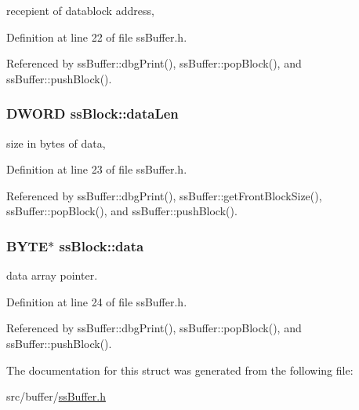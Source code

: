 recepient of datablock address, 



Definition at line 22 of file ssBuffer.h.



Referenced by ssBuffer::dbgPrint(), ssBuffer::popBlock(), and ssBuffer::pushBlock().

\hypertarget{structssBlock_ad3ca966219ea058e35c458f497d1ed0f}{
\subsubsection[{dataLen}]{\setlength{\rightskip}{0pt plus 5cm}DWORD {\bf ssBlock::dataLen}}}
\label{d2/dfa/structssBlock_ad3ca966219ea058e35c458f497d1ed0f}


size in bytes of data, 



Definition at line 23 of file ssBuffer.h.



Referenced by ssBuffer::dbgPrint(), ssBuffer::getFrontBlockSize(), ssBuffer::popBlock(), and ssBuffer::pushBlock().

\hypertarget{structssBlock_ac7f1c86e2783bf2ce7f0caea385d38a2}{
\subsubsection[{data}]{\setlength{\rightskip}{0pt plus 5cm}BYTE$\ast$ {\bf ssBlock::data}}}
\label{d2/dfa/structssBlock_ac7f1c86e2783bf2ce7f0caea385d38a2}


data array pointer. 



Definition at line 24 of file ssBuffer.h.



Referenced by ssBuffer::dbgPrint(), ssBuffer::popBlock(), and ssBuffer::pushBlock().



The documentation for this struct was generated from the following file:\begin{DoxyCompactItemize}
\item 
src/buffer/\hyperlink{ssBuffer_8h}{ssBuffer.h}\end{DoxyCompactItemize}
